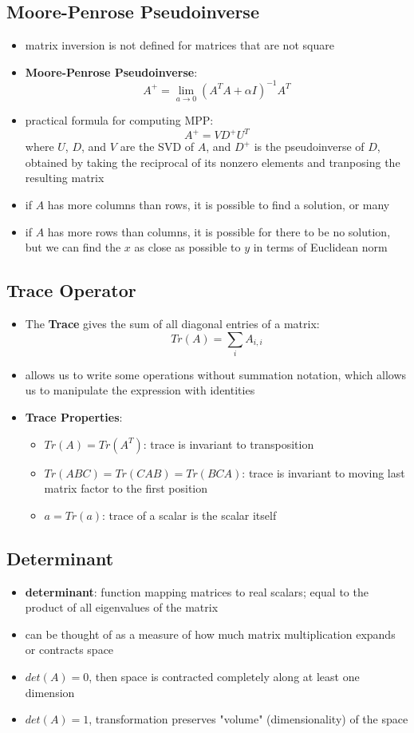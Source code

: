 \subsection{Moore-Penrose Pseudoinverse}
\begin{itemize}
    \item matrix inversion is not defined for matrices that are not square
    \item \textbf{Moore-Penrose Pseudoinverse}:
    $$ A^+ = \lim_{a \rightarrow 0}(A^TA + \alpha I)^{-1}A^T$$
    \item practical formula for computing MPP:
    $$ A^+ = V D^+ U^T$$
    where $U$, $D$, and $V$ are the SVD of $A$, and $D^+$ is the pseudoinverse of $D$, obtained by taking the reciprocal of its nonzero elements and tranposing the resulting matrix
    \item if $A$ has more columns than rows, it is possible to find a solution, or many
    \item if $A$ has more rows than columns, it is possible for there to be no solution, but we can find the $x$ as close as possible to $y$ in terms of Euclidean norm
\end{itemize}

\subsection{Trace Operator}
\begin{itemize}
    \item The \textbf{Trace} gives the sum of all diagonal entries of a matrix:
    $$ Tr(A) = \sum_i A_{i,i}$$
    \item allows us to write some operations without summation notation, which allows us to manipulate the expression with identities 
    \item \textbf{Trace Properties}:
    \begin{itemize}
        \item $Tr(A) = Tr(A^T)$: trace is invariant to transposition
        \item $Tr(ABC) = Tr(CAB) = Tr(BCA)$: trace is invariant to moving last matrix factor to the first position
        \item $a = Tr(a)$: trace of a scalar is the scalar itself
    \end{itemize}
\end{itemize}

\subsection{Determinant}
\begin{itemize}
    \item \textbf{determinant}: function mapping matrices to real scalars; equal to the product of all eigenvalues of the matrix
    \item can be thought of as a measure of how much matrix multiplication expands or contracts space
    \item $det(A) = 0$, then space is contracted completely along at least one dimension
    \item $det(A) = 1$, transformation preserves "volume" (dimensionality) of the space
\end{itemize}

